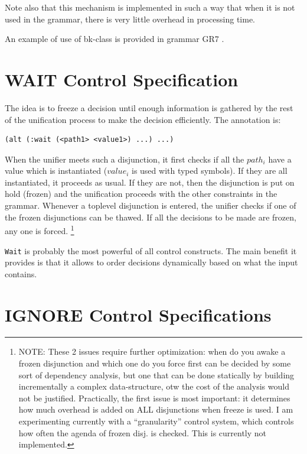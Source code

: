 \documentclass[10pt,a4paper]{report}
\begin{document}
\begin{appendices}
Note also that this mechanism is implemented in such a way that when it
is not used in the grammar, there is very little overhead in processing
time. 

An example of use of bk-class is provided in grammar GR7 . 


\section{WAIT Control Specification}

The idea is to freeze a decision until enough information is gathered by
the rest of the unification process to make the decision efficiently. 
The annotation is:

\begin{lstlisting}[language=Lisp]
	(alt (:wait (<path1> <value1>) ...) ...)
\end{lstlisting}

When the unifier meets such a disjunction, it first checks if all the
$path_i$ have a value which is instantiated ($value_i$ is used with typed
symbols).  If they are all instantiated, it proceeds as usual.
If they are not, then the disjunction is put on hold (frozen) and the
unification proceeds with the other constraints in the grammar.  
Whenever a toplevel disjunction is entered, the unifier checks if one of
the frozen disjunctions can be thawed.  If all the decisions to be made are
frozen, any one is forced. 
\footnote{NOTE: These 2 issues require further optimization: when do you awake a
frozen disjunction and which one do you force first can be decided by some
sort of dependency analysis, but one that can be done statically by
building incrementally a complex data-structure, otw the cost of the
analysis would not be justified.  Practically, the first issue is most
important: it determines how much overhead is added on ALL disjunctions
when freeze is used.  I am experimenting currently with a ``granularity''
control system, which controls how often the agenda of frozen disj. is
checked.  This is currently not implemented.}

{\tt Wait} is probably the most powerful of all control constructs.  The main
benefit it provides is that it allows to order decisions dynamically based
on what the input contains.


\section{IGNORE Control Specifications}


\end{appendices}
\end{document}
